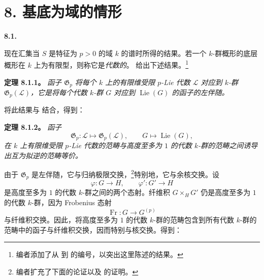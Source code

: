 
\section*{8. 基底为域的情形}
\label{sga3:VIIA:8}

\medskip
\noindent\textbf{8.1.}
\label{sga3:VIIA:8.1}

现在汇集当 \(S\) 是特征为 \(p>0\) 的域 \(k\) 的谱时所得的结果。若一个 \(k\)-群概形的底层概形在 \(k\) 上为有限型，则称它是\emph{代数的}。 给出下述结果。\footnote{编者添加了从  到  的编号，以突出这里陈述的结果。}

\medskip
\noindent\textbf{定理 8.1.1。}
\label{sga3:VIIA:8.1.1}
\textit{函子 \(\mathfrak G_p\) 将每个 \(k\) 上的有限维受限 \(p\)-Lie 代数 \(\mathcal L\) 对应到 \(k\)-群 \(\mathfrak G_p(\mathcal L)\)，它是将每个代数 \(k\)-群 \(G\) 对应到 \(\operatorname{Lie}(G)\) 的函子的左伴随。}

将此结果与  结合，得到：

\medskip
\noindent\textbf{定理 8.1.2。}
\label{sga3:VIIA:8.1.2}
\textit{函子
\[
  \mathfrak G_p:
  \mathcal L\longmapsto\mathfrak G_p(\mathcal L),
  \qquad
  G\longmapsto\operatorname{Lie}(G),
\]
在 \(k\) 上有限维受限 \(p\)-Lie 代数的范畴与高度至多为 \(1\) 的代数 \(k\)-群的范畴之间诱导出互为拟逆的范畴等价。}

由于 \(\mathfrak G_p\) 是左伴随，它与归纳极限交换，\footnote{编者扩充了下面的论证以及  的证明。}特别地，它与余核交换。设
\[
  \varphi:G\longrightarrow H,
  \qquad
  \varphi':G'\longrightarrow H
\]
是高度至多为 \(1\) 的代数 \(k\)-群之间的两个态射。纤维积 \(G\times_HG'\) 仍是高度至多为 \(1\) 的代数 \(k\)-群，因为 Frobenius 态射
\[
  \operatorname{Fr}:G\longrightarrow G^{(p)}
\]
与纤维积交换。因此，将高度至多为 \(1\) 的代数 \(k\)-群的范畴包含到所有代数 \(k\)-群的范畴中的函子与纤维积交换，因而特别与核交换。得到：

